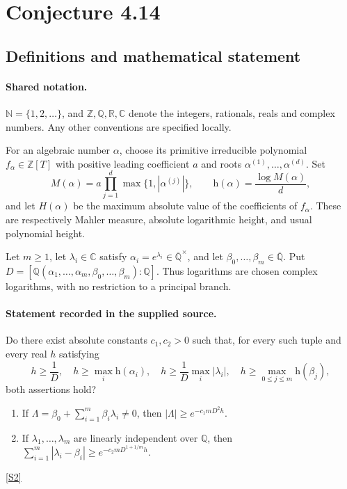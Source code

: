 \documentclass[11pt]{article}
\newcommand{\sref}[2]{\hyperlink{source:#1:#2}{[S#2]}}
\begin{document}
\section{Conjecture 4.14}\label{statement}

\subsection{Definitions and mathematical statement}

\paragraph{Shared notation.}$\mathbb N=\{1,2,\ldots\}$, and $\mathbb Z,\mathbb Q,\mathbb R,\mathbb C$ denote the integers, rationals, reals and complex numbers. Any other conventions are specified locally.


For an algebraic number $\alpha$, choose its primitive irreducible polynomial $f_\alpha\in\mathbb Z[T]$ with positive leading coefficient $a$ and roots $\alpha^{(1)},\ldots,\alpha^{(d)}$. Set
\[
 M(\alpha)=a\prod_{j=1}^d\max\{1,|\alpha^{(j)}|\},\qquad
 \mathrm h(\alpha)=\frac{\log M(\alpha)}d,
\]
and let $H(\alpha)$ be the maximum absolute value of the coefficients of $f_\alpha$. These are respectively Mahler measure, absolute logarithmic height, and usual polynomial height.

Let $m\ge1$, let $\lambda_i\in\mathbb C$ satisfy $\alpha_i=e^{\lambda_i}\in\overline{\mathbb Q}^{\times}$, and let $\beta_0,\ldots,\beta_m\in\overline{\mathbb Q}$. Put $D=[\mathbb Q(\alpha_1,\ldots,\alpha_m,\beta_0,\ldots,\beta_m):\mathbb Q]$. Thus logarithms are chosen complex logarithms, with no restriction to a principal branch.
\paragraph{Statement recorded in the supplied source.}
Do there exist absolute constants $c_1,c_2>0$ such that, for every such tuple and every real $h$ satisfying
\[
h\ge \frac1D,\quad h\ge\max_i\mathrm h(\alpha_i),\quad h\ge\frac1D\max_i|\lambda_i|,\quad h\ge\max_{0\le j\le m}\mathrm h(\beta_j),
\]
both assertions hold?
\begin{enumerate}
\item If $\Lambda=\beta_0+\sum_{i=1}^m\beta_i\lambda_i\ne0$, then $|\Lambda|\ge e^{-c_1mD^2h}$.
\item If $\lambda_1,\ldots,\lambda_m$ are linearly independent over $\mathbb Q$, then $\sum_{i=1}^m|\lambda_i-\beta_i|\ge e^{-c_2mD^{1+1/m}h}$.
\end{enumerate} \sref{statement}{2}
\end{document}
